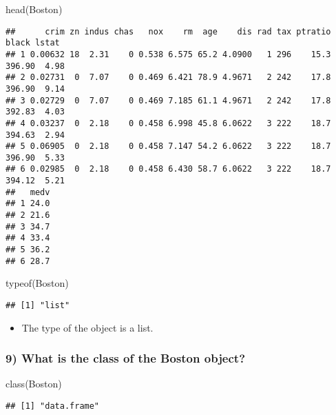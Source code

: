 \documentclass[
  12pt,
]{article}
\newenvironment{Shaded}{\begin{snugshade}}{\end{snugshade}}
\newcommand{\FunctionTok}[1]{\textcolor[rgb]{0.00,0.00,0.00}{#1}}
\newcommand{\NormalTok}[1]{#1}
\providecommand{\tightlist}{%
  \setlength{\itemsep}{0pt}\setlength{\parskip}{0pt}}
\begin{document}
\begin{Shaded}
\begin{Highlighting}[]
\FunctionTok{head}\NormalTok{(Boston)}
\end{Highlighting}
\end{Shaded}

\begin{verbatim}
##      crim zn indus chas   nox    rm  age    dis rad tax ptratio  black lstat
## 1 0.00632 18  2.31    0 0.538 6.575 65.2 4.0900   1 296    15.3 396.90  4.98
## 2 0.02731  0  7.07    0 0.469 6.421 78.9 4.9671   2 242    17.8 396.90  9.14
## 3 0.02729  0  7.07    0 0.469 7.185 61.1 4.9671   2 242    17.8 392.83  4.03
## 4 0.03237  0  2.18    0 0.458 6.998 45.8 6.0622   3 222    18.7 394.63  2.94
## 5 0.06905  0  2.18    0 0.458 7.147 54.2 6.0622   3 222    18.7 396.90  5.33
## 6 0.02985  0  2.18    0 0.458 6.430 58.7 6.0622   3 222    18.7 394.12  5.21
##   medv
## 1 24.0
## 2 21.6
## 3 34.7
## 4 33.4
## 5 36.2
## 6 28.7
\end{verbatim}

\begin{Shaded}
\begin{Highlighting}[]
\FunctionTok{typeof}\NormalTok{(Boston)}
\end{Highlighting}
\end{Shaded}

\begin{verbatim}
## [1] "list"
\end{verbatim}

\begin{itemize}
\tightlist
\item
  The type of the object is a list.
\end{itemize}

\hypertarget{what-is-the-class-of-the-boston-object}{%
\subsubsection{9) What is the class of the Boston
object?}\label{what-is-the-class-of-the-boston-object}}

\begin{Shaded}
\begin{Highlighting}[]
\FunctionTok{class}\NormalTok{(Boston)}
\end{Highlighting}
\end{Shaded}

\begin{verbatim}
## [1] "data.frame"
\end{verbatim}
\end{document}
